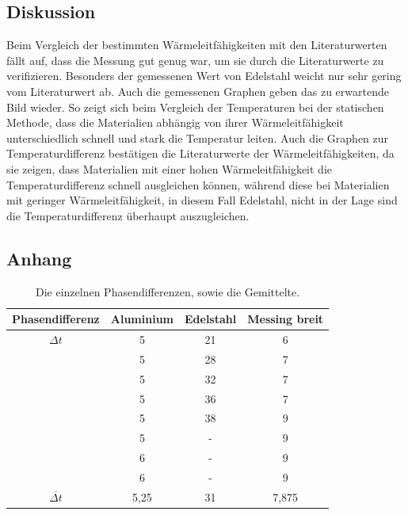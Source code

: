 \documentclass[titlepage = firstcover]{scrartcl}
\begin{document}
  \FloatBarrier

  \subsection{Diskussion}
   Beim Vergleich der bestimmten Wärmeleitfähigkeiten mit den Literaturwerten fällt auf, dass die Messung gut genug war, um sie durch die Literaturwerte zu
   verifizieren. Besonders der gemessenen Wert von Edelstahl weicht nur sehr gering vom Literaturwert ab. Auch die gemessenen Graphen geben das zu erwartende
   Bild wieder. So zeigt sich beim Vergleich der Temperaturen bei der statischen Methode, dass die Materialien abhängig von ihrer Wärmeleitfähigkeit
  unterschiedlich schnell und stark die Temperatur leiten. Auch die Graphen zur Temperaturdifferenz bestätigen die Literaturwerte der Wärmeleitfähigkeiten, da
  sie zeigen, dass Materialien mit einer hohen Wärmeleitfähigkeit die Temperaturdifferenz schnell ausgleichen können, während diese bei Materialien mit geringer
  Wärmeleitfähigkeit, in diesem Fall Edelstahl, nicht in der Lage sind die Temperaturdifferenz überhaupt auszugleichen.


  \subsection{Anhang}
        \begin{table}[h]
          \centering
          \caption{Die einzelnen Phasendifferenzen, sowie die Gemittelte.}
          \label{tab:Phasen}
          \begin{tabular}{c c c c}
            \toprule
            {Phasendifferenz} & {Aluminium} & {Edelstahl} & {Messing breit}\\
            \midrule
            $\Delta t$      & 5     & 21    & 6 \\
                            & 5     & 28    & 7 \\
                            & 5     & 32    & 7 \\
                            & 5     & 36    & 7 \\
                            & 5     & 38    & 9 \\
                            & 5     & -     & 9 \\
                            & 6     & -     & 9 \\
                            & 6     & -     & 9 \\
      $\overline{\Delta t}$ & 5,25  & 31    & 7,875 \\
            \bottomrule
          \end{tabular}
        \end{table}
\end{document}
